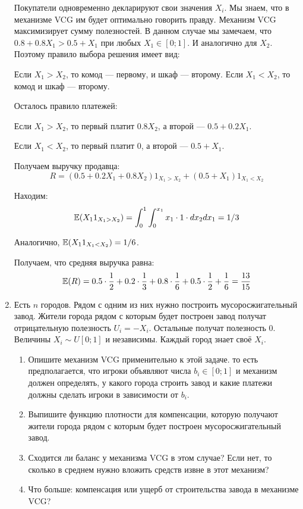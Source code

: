 \begin{enumerate}
Покупатели одновременно декларируют свои значения $ X_{i} $. Мы знаем, что в механизме VCG им будет оптимально говорить правду. Механизм VCG максимизирует сумму полезностей. В данном случае мы замечаем, что $ 0.8+0.8X_{1}>0.5+X_{1} $ при любых $ X_{1} \in [0;1]$. И аналогично для $ X_{2} $. Поэтому правило выбора решения имеет вид:

Если $ X_{1}>X_{2} $, то комод — первому, и шкаф — второму. Если $ X_{1}<X_{2} $, то комод и шкаф — второму.

Осталось правило платежей:

Если $ X_{1}>X_{2} $, то первый платит $ 0.8X_{2} $, а второй — $ 0.5+0.2X_{1} $.

Если $ X_{1}<X_{2} $, то первый платит 0, а второй — $ 0.5+X_{1} $.

Получаем выручку продавца:
\begin{equation}
R=(0.5+0.2X_{1}+0.8X_{2})1_{X_{1}>X_{2}}+(0.5+X_{1})1_{X_{1}<X_{2}}
\end{equation}

Находим:
\begin{equation}
\mathbb{E}(X_{1}1_{X_{1}>X_{2}})=\int_{0}^{1}\int_{0}^{x_{1}}x_{1} \cdot 1 \cdot dx_{2}dx_{1}=1/3
\end{equation}

Аналогично, $ \mathbb{E}(X_{1}1_{X_{1}<X_{2}})=1/6 $.

Получаем, что средняя выручка равна:
\begin{equation}
\mathbb{E}(R)=0.5\cdot \frac{1}{2}+0.2\cdot \frac{1}{3}+0.8\cdot \frac{1}{6}+0.5\cdot \frac{1}{2}+\frac{1}{6}=\frac{13}{15}
\end{equation}

\item Есть $ n $ городов. Рядом с одним из них нужно построить мусоросжигательный завод. Жители города рядом с которым будет построен завод получат отрицательную полезность $ U_{i}=-X_{i} $. Остальные получат полезность 0. Величины $ X_{i}\sim U[0;1] $ и независимы. Каждый город знает своё $ X_{i} $. 
\begin{enumerate}
\item Опишите механизм VCG применительно к этой задаче. то есть предполагается, что игроки объявляют числа $ b_{i}\in [0;1] $ и механизм должен определять, у какого города строить завод и какие платежи должны сделать игроки в зависимости от $ b_{i} $.
\item Выпишите функцию плотности для компенсации, которую получают жители города рядом с которым будет построен мусоросжигательный завод.
\item Сходится ли баланс у механизма VCG в этом случае? Если нет, то сколько в среднем нужно вложить средств извне в этот механизм?
\item Что больше: компенсация или ущерб от строительства завода в механизме VCG?
\end{enumerate}


\end{enumerate}

